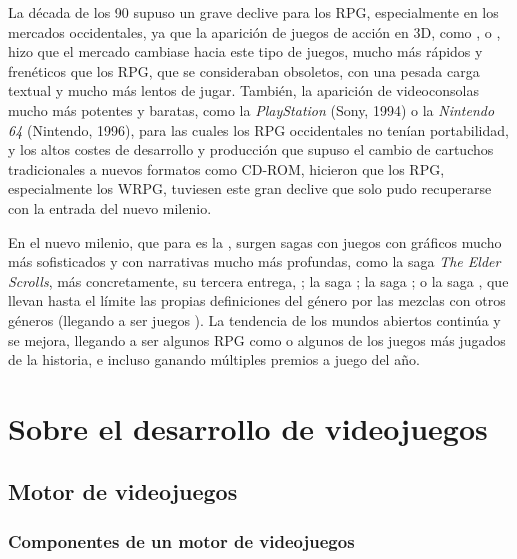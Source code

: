 La década de los 90 supuso un grave declive para los RPG, especialmente en los mercados occidentales, ya que la aparición de juegos de acción en 3D, como ,  o , hizo que el mercado cambiase hacia este tipo de juegos, mucho más rápidos y frenéticos que los RPG, que se consideraban obsoletos, con una pesada carga textual y mucho más lentos de jugar. También, la aparición de videoconsolas mucho más potentes y baratas, como la \textit{PlayStation} (Sony, 1994) o la \textit{Nintendo 64} (Nintendo, 1996), para las cuales los RPG occidentales no tenían portabilidad, y los altos costes de desarrollo y producción que supuso el cambio de cartuchos tradicionales a nuevos formatos como CD-ROM, hicieron que los RPG, especialmente los WRPG, tuviesen este gran declive que solo pudo recuperarse con la entrada del nuevo milenio.

\medskip

En el nuevo milenio, que para \citeauthor{barton2008dungeons} es la , surgen sagas con juegos con gráficos mucho más sofisticados y con narrativas mucho más profundas, como la saga \textit{The Elder Scrolls}, más concretamente, su tercera entrega, ; la saga ; la saga ; o la saga , que llevan hasta el límite las propias definiciones del género por las mezclas con otros géneros (llegando a ser juegos ). La tendencia de los mundos abiertos continúa y se mejora, llegando a ser algunos RPG como  o  algunos de los juegos más jugados de la historia, e incluso ganando múltiples premios a juego del año.

\section{Sobre el desarrollo de videojuegos}

\subsection{Motor de videojuegos}

\subsubsection{Componentes de un motor de videojuegos}

